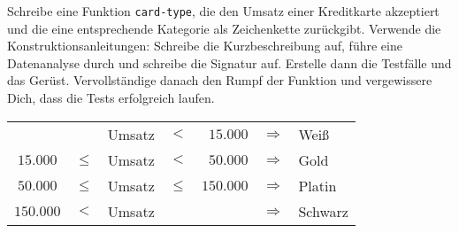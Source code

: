 \begin{aufgabe}
  Schreibe eine Funktion \lstinline{card-type}, die den Umsatz einer
  Kreditkarte akzeptiert und die eine entsprechende Kategorie als
  Zeichenkette zurückgibt.  Verwende die Konstruktionsanleitungen:
  Schreibe die Kurzbeschreibung auf, führe eine
  Datenanalyse durch und schreibe die Signatur auf. Erstelle
  dann die Testfälle und das Gerüst.  Vervollständige danach den
  Rumpf der Funktion und vergewissere Dich, dass die Tests
  erfolgreich laufen. \\

  \begin{tabular}{crlcrll}
    &        & Umsatz & $<$ & $15.000$   & $\Longrightarrow$ & Weiß \\
    $15.000$  & $\leq$ & Umsatz & $<$ & $50.000 $  & $\Longrightarrow$ & Gold \\
    $50.000$  & $\leq$ & Umsatz & $\leq$ & $150.000 $ 
    & $\Longrightarrow$ & Platin \\
    $150.000$ & $<$ & Umsatz &     &            &  $\Longrightarrow$ & Schwarz \\
  \end{tabular} \\
\end{aufgabe}

